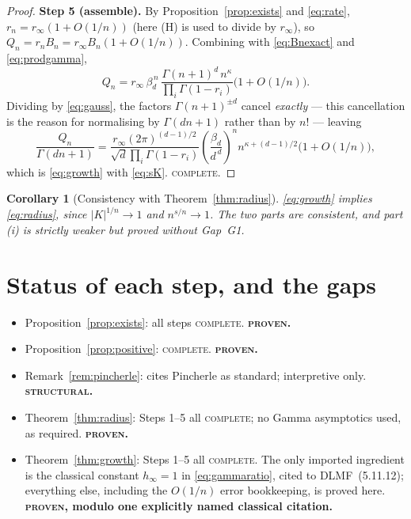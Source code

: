 \documentclass[11pt]{article}
\newtheorem{corollary}[theorem]{Corollary}
\theoremstyle{definition}
\newcommand{\bd}{\beta_d}
\newcommand{\rinf}{r_\infty}
\begin{document}
\begin{proof}
\medskip\noindent\textbf{Step 5 (assemble).}
By Proposition~\ref{prop:exists} and \eqref{eq:rate}, $r_n=\rinf(1+O(1/n))$
(here (H) is used to divide by $\rinf$), so $Q_n=r_nB_n=\rinf B_n(1+O(1/n))$.
Combining with \eqref{eq:Bnexact} and \eqref{eq:prodgamma},
\[
Q_n=\rinf\,\bd^{\,n}\,
\frac{\Gamma(n+1)^{d}\,n^{\kappa}}{\prod_i\Gamma(1-r_i)}\bigl(1+O(1/n)\bigr).
\]
Dividing by \eqref{eq:gauss}, the factors $\Gamma(n+1)^{\pm d}$ cancel
\emph{exactly} --- this cancellation is the reason for normalising by
$\Gamma(dn+1)$ rather than by $n!$ --- leaving
\[
\frac{Q_n}{\Gamma(dn+1)}
=\frac{\rinf(2\pi)^{(d-1)/2}}{\sqrt d\prod_i\Gamma(1-r_i)}
\left(\frac{\bd}{d^{\,d}}\right)^{\!n}
n^{\kappa+(d-1)/2}\bigl(1+O(1/n)\bigr),
\]
which is \eqref{eq:growth} with \eqref{eq:sK}. \textsc{complete.}
\end{proof}

\begin{corollary}[Consistency with Theorem~\ref{thm:radius}]
\eqref{eq:growth} implies \eqref{eq:radius}, since $|K|^{1/n}\to1$ and
$n^{s/n}\to1$. The two parts are consistent, and part (i) is strictly weaker but
proved without Gap~G1.
\end{corollary}

\section{Status of each step, and the gaps}\label{sec:gaps}

\begin{itemize}
\item Proposition~\ref{prop:exists}: all steps \textsc{complete}.
\textbf{\textsc{proven}.}
\item Proposition~\ref{prop:positive}: \textsc{complete}. \textbf{\textsc{proven}.}
\item Remark~\ref{rem:pincherle}: cites Pincherle as standard; interpretive only.
\textbf{\textsc{structural}.}
\item Theorem~\ref{thm:radius}: Steps 1--5 all \textsc{complete}; no Gamma
asymptotics used, as required. \textbf{\textsc{proven}.}
\item Theorem~\ref{thm:growth}: Steps 1--5 all \textsc{complete}. The only
imported ingredient is the classical constant $h_\infty=1$ in
\eqref{eq:gammaratio}, cited to DLMF~(5.11.12); everything else, including the
$O(1/n)$ error bookkeeping, is proved here. \textbf{\textsc{proven}, modulo one
explicitly named classical citation.}
\end{itemize}
\end{document}
